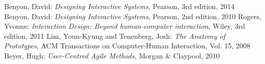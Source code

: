 \begin{thebibliography}{9}
  Benyon, David: \emph{Designing Interactive Systems}, Pearson, 3rd edition, 2014
  Benyon, David: \emph{Designing Interactive Systems}, Pearson, 2nd edition, 2010
  Rogers, Yvonne: \emph{Interaction Design: Beyond human-computer interaction}, Wiley, 3rd edition, 2011
  Lim, Youn-Kyung and Tenenberg, Josh: \emph{The Anatomy of Prototypes}, ACM
  Transactions on Computer-Human Interaction, Vol. 15, 2008
  Beyer, Hugh: \emph{User-Centred Agile Methods}, Morgan \& Claypool, 2010
\end{thebibliography}

